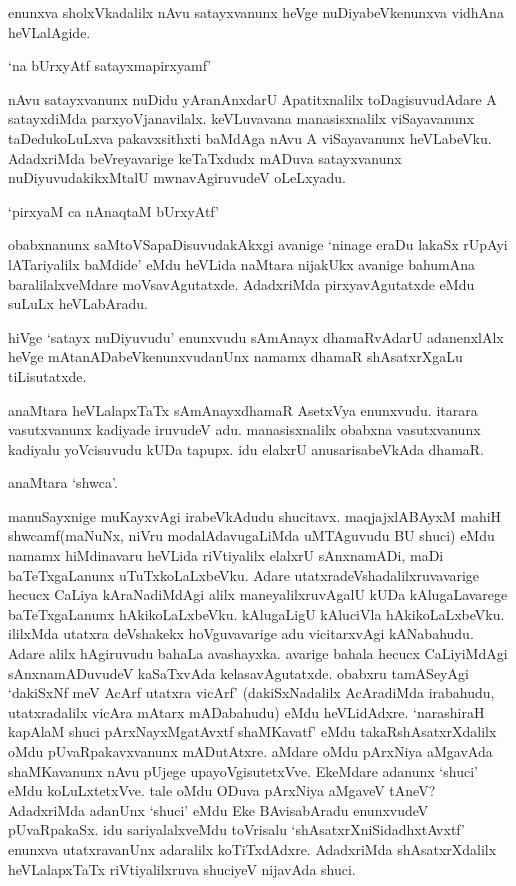 enunxva sholxVkadalilx nAvu satayxvanunx heVge nuDiyabeVkenunxva vidhAna heVLalAgide.

\begin{shloka}
`na bUrxyAtf satayxmapirxyamf'
\end{shloka}

nAvu satayxvanunx nuDidu yAranAnxdarU Apatitxnalilx toDagisuvudAdare A satayxdiMda parxyoVjanavilalx. keVLuvavana manasisxnalilx viSayavanunx taDedukoLuLxva pakavxsithxti baMdAga nAvu A viSayavanunx heVLabeVku. AdadxriMda beVreyavarige keTaTxdudx mADuva satayxvanunx nuDiyuvudakikxMtalU mwnavAgiruvudeV oLeLxyadu.

\begin{shloka}
`pirxyaM ca nAnaqtaM bUrxyAtf'
\end{shloka}

obabxnanunx saMtoVSapaDisuvudakAkxgi avanige `ninage eraDu lakaSx rUpAyi lATariyalilx baMdide' eMdu heVLida naMtara nijakUkx avanige bahumAna baralilalxveMdare moVsavAgutatxde. AdadxriMda pirxyavAgutatxde eMdu suLuLx heVLabAradu.

hiVge `satayx nuDiyuvudu' enunxvudu sAmAnayx dhamaRvAdarU adanenxlAlx heVge mAtanADabeVkenunxvudanUnx namamx dhamaR shAsatxrXgaLu tiLisutatxde.

anaMtara heVLalapxTaTx sAmAnayxdhamaR AsetxVya enunxvudu. itarara vasutxvanunx kadiyade iruvudeV adu. manasisxnalilx obabxna vasutxvanunx kadiyalu yoVcisuvudu kUDa tapupx. idu elalxrU anusarisabeVkAda dhamaR.

anaMtara `shwca'.

manuSayxnige muKayxvAgi irabeVkAdudu shucitavx. maqjajxlABAyxM mahiH shwcamf(maNuNx, niVru modalAdavugaLiMda uMTAguvudu BU shuci) eMdu namamx hiMdinavaru heVLida riVtiyalilx elalxrU sAnxnamADi, maDi baTeTxgaLanunx uTuTxkoLaLxbeVku. Adare utatxradeVshadalilxruvavarige hecucx CaLiya kAraNadiMdAgi alilx maneyalilxruvAgalU kUDa kAlugaLavarege baTeTxgaLanunx hAkikoLaLxbeVku. kAlugaLigU kAluciVla hAkikoLaLxbeVku. ililxMda utatxra deVshakekx hoVguvavarige adu vicitarxvAgi kANabahudu. Adare alilx hAgiruvudu bahaLa avashayxka. avarige bahala hecucx CaLiyiMdAgi sAnxnamADuvudeV kaSaTxvAda kelasavAgutatxde. obabxru tamASeyAgi `dakiSxNf meV AcArf utatxra vicArf' (dakiSxNadalilx AcAradiMda irabahudu, utatxradalilx vicAra mAtarx mADabahudu) eMdu heVLidAdxre. `narashiraH kapAlaM shuci pArxNayxMgatAvxtf shaMKavatf' eMdu takaRshAsatxrXdalilx oMdu pUvaRpakavxvanunx mADutAtxre. aMdare oMdu pArxNiya aMgavAda shaMKavanunx nAvu pUjege upayoVgisutetxVve. EkeMdare adanunx `shuci' eMdu koLuLxtetxVve. tale oMdu ODuva pArxNiya aMgaveV tAneV? AdadxriMda adanUnx `shuci' eMdu Eke BAvisabAradu enunxvudeV pUvaRpakaSx. idu sariyalalxveMdu toVrisalu `shAsatxrXniSidadhxtAvxtf' enunxva utatxravanUnx adaralilx koTiTxdAdxre. AdadxriMda shAsatxrXdalilx heVLalapxTaTx riVtiyalilxruva shuciyeV nijavAda shuci.

